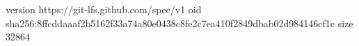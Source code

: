 version https://git-lfs.github.com/spec/v1
oid sha256:8ffcddaaaf2b5162f33a74a80e0438c8fe2c7ea410f2849dbab02d984146cf1c
size 32864
